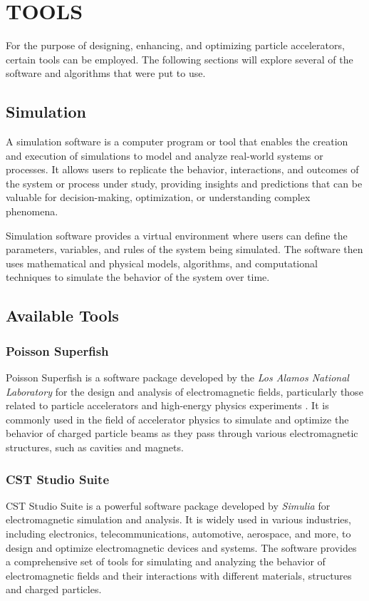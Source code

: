 \documentclass[a4paper,oneside,12pt]{report}
\numberwithin{equation}{chapter}
\begin{document}
\newpage


\chapter{TOOLS}

For the purpose of designing, enhancing, and optimizing particle accelerators, certain tools can be employed. 
The following sections will explore several of the software and algorithms that were put to use.

\section{Simulation}
A simulation software is a computer program or tool that enables the creation and execution of 
simulations to model and analyze real-world systems or processes. 
It allows users to replicate the behavior, interactions, and outcomes of the system or process under study, 
providing insights and predictions that can be valuable for decision-making, optimization, or understanding complex phenomena.

Simulation software provides a virtual environment where users can define the parameters,
variables, and rules of the system being simulated. The software then uses mathematical and physical models, 
algorithms, and computational techniques to simulate the behavior of the system over time.



\section{Available Tools}

\subsection{Poisson Superfish}
Poisson Superfish is a software package developed by the \textit{Los Alamos National Laboratory} 
for the design and analysis of electromagnetic fields, particularly those related to particle accelerators and high-energy physics experiments \cite{poi-sup}.
It is commonly used in the field of accelerator physics to simulate and optimize the behavior of charged particle beams as they pass through various electromagnetic structures, such as cavities and magnets.


\subsection{CST Studio Suite}
CST Studio Suite is a powerful software package developed by \textit{Simulia} for electromagnetic simulation and analysis. It is widely used in various industries, including electronics, telecommunications, automotive, aerospace, and more, to design and optimize electromagnetic devices and systems. 
The software provides a comprehensive set of tools for simulating and analyzing the behavior of electromagnetic fields and their interactions with different materials, structures and charged particles.
\end{document}
